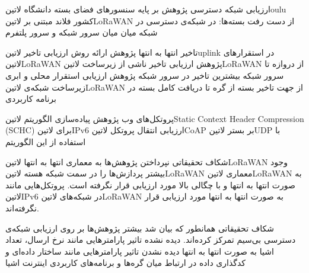 \documentclass[dvipsnames]{beamer}
\begin{document}
\begin{persian}
	\begin{frame}{ارزیابی شبکه دسترسی}
	   پژوهش  بر پایه سنسورهای فضای بسته دانشگاه ‌لاتین{oulu} کشور فلاند مبتنی بر ‌لاتین{LoRaWAN}
	   از دست رفت بسته‌ها:
	   در شبکه‌ی دسترسی
	   در شبکه میان میان سرور شبکه و سرور پلتفرم
	\end{frame}

	\begin{frame}{تاخیر انتها به انتها}
	   پژوهش 
	   ارائه روش ارزیابی تاخیر ‌لاتین{uplink} در استقرارهای ‌لاتین{LoRaWAN}
	   پژوهش 
	   ارزیابی تاخیر ناشی از زیرساخت ‌لاتین{LoRaWAN} از دروازه تا سرور شبکه
	   بیشترین تاخیر در سرور شبکه
	   پژوهش 
	   ارزیابی استقرار محلی و ابری زیرساخت شبکه‌ی ‌لاتین{LoRaWAN} از جهت تاخیر بسته از گره تا دریافت کامل بسته در برنامه کاربردی
	\end{frame}

	\begin{frame}{پروتکل‌های وب}
	   پژوهش 
	   پیاده‌سازی الگوریتم ‌لاتین{Static Context Header Compression (SCHC)} برای ‌لاتین{IPv6}
	   ارزیابی انتقال پروتکل ‌لاتین{CoAP} بر بستر ‌لاتین{UDP} با استفاده از این الگوریتم
	\end{frame}

	\begin{frame}{شکاف تحقیقاتی}
	   نپرداختن پژوهش‌ها به معماری انتها به انتها ‌لاتین{LoRaWAN}
	   وجود بیشتر پردازش‌ها را در سمت شبکه هسته ‌لاتین{LoRaWAN}
	   معماری ‌لاتین{LoRaWAN} به صورت انتها به انتها و با چگالی بالا مورد ارزیابی قرار نگرفته است.
	   پروتکل‌هایی مانند ‌لاتین{IPv6} در شبکه‌های ‌لاتین{LoRaWAN} به صورت انتها به انتها مورد ارزیابی قرار نگرفته‌اند.
	\end{frame}

	\begin{frame}{شکاف تحقیقاتی}
		 همانطور که بیان شد بیشتر پژوهش‌ها بر روی ارزیابی شبکه‌ی دسترسی بی‌سیم تمرکز کرده‌اند.
		 دیده نشده تاثیر پارامترهایی مانند نرخ ارسال، تعداد اشیا به صورت انتها به انتها
		 دیده نشدن تاثیر پارامترهایی مانند ساختار داده‌ای و کدگذاری داده در ارتباط میان گره‌ها و برنامه‌های کاربردی اینترنت اشیا
	\end{frame}


\end{persian}
\end{document}
